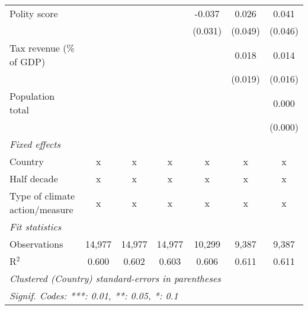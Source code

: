 \begin{tabular}{lcccccc}
   Polity score                                         &              &                &                & -0.037         & 0.026          & 0.041\\   
                                                        &              &                &                & (0.031)        & (0.049)        & (0.046)\\   
   Tax revenue (\% of GDP)                              &              &                &                &                & 0.018          & 0.014\\   
                                                        &              &                &                &                & (0.019)        & (0.016)\\   
   Population total                                     &              &                &                &                &                & 0.000\\   
                                                        &              &                &                &                &                & (0.000)\\   
   \emph{Fixed effects}\\
   Country                                              & x            & x              & x              & x              & x              & x\\  
   Half decade                                          & x            & x              & x              & x              & x              & x\\  
   Type of climate action/measure                       & x            & x              & x              & x              & x              & x\\  
   \midrule \emph{Fit statistics}\\
   Observations                                         & 14,977       & 14,977         & 14,977         & 10,299         & 9,387          & 9,387\\  
   R$^2$                                                & 0.600        & 0.602          & 0.603          & 0.606          & 0.611          & 0.611\\  
   \midrule
   \multicolumn{7}{l}{\emph{Clustered (Country) standard-errors in parentheses}}\\
   \multicolumn{7}{l}{\emph{Signif. Codes: ***: 0.01, **: 0.05, *: 0.1}}\\
\end{tabular}
\par\endgroup


